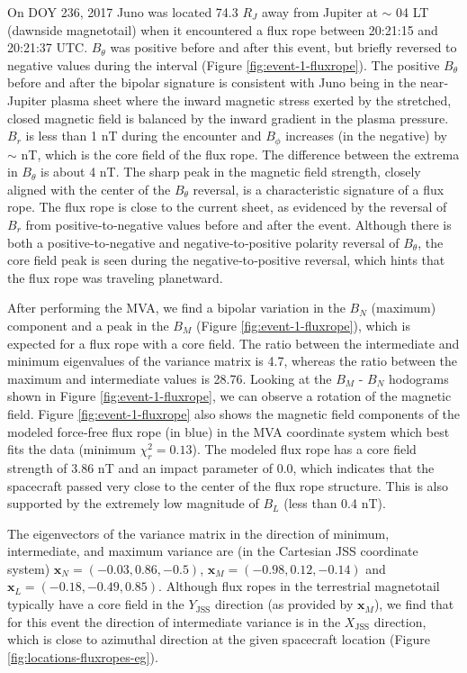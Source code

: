 On DOY 236, 2017 Juno was located 74.3 $R_J$ away from Jupiter at $\sim$ 04 LT (dawnside magnetotail) when it encountered a flux rope between 20:21:15 and 20:21:37 UTC. $B_\theta$ was positive before and after this event, but briefly reversed to negative values during the interval (Figure \ref{fig:event-1-fluxrope}). The positive $B_\theta$ before and after the bipolar signature is consistent with Juno being in the near‐Jupiter plasma sheet where the inward magnetic stress exerted by the stretched, closed magnetic field is balanced by the inward gradient in the plasma pressure. $B_r$ is less than 1 nT during the encounter and $B_\phi$ increases (in the negative) by $\sim$ nT, which is the core field of the flux rope. The difference between the extrema in $B_\theta$ is about 4 nT. The sharp peak in the magnetic field strength, closely aligned with the center of the $B_\theta$ reversal, is a characteristic signature of a flux rope. The flux rope is close to the current sheet, as evidenced by the reversal of $B_r$ from positive‐to‐negative values before and after the event. Although there is both a positive‐to‐negative and negative‐to‐positive polarity reversal of $B_\theta$, the core field peak is seen during the negative‐to‐positive reversal, which hints that the flux rope was traveling planetward.

After performing the MVA, we find a bipolar variation in the $B_N$ (maximum) component and a peak in the $B_M$ (Figure \ref{fig:event-1-fluxrope}), which is expected for a flux rope with a core field. The ratio between the intermediate and minimum eigenvalues of the variance matrix is 4.7, whereas the ratio between the maximum and intermediate values is 28.76. Looking at the $B_M$ - $B_N$ hodograms shown in Figure \ref{fig:event-1-fluxrope}, we can observe a rotation of the magnetic field. Figure \ref{fig:event-1-fluxrope} also shows the magnetic field components of the modeled force‐free flux rope (in blue) in the MVA coordinate system which best fits the data (minimum $\chi_r^2 = 0.13$). The modeled flux rope has a core field strength of 3.86 nT and an impact parameter of 0.0, which indicates that the spacecraft passed very close to the center of the flux rope structure. This is also supported by the extremely low magnitude of $B_L$ (less than 0.4 nT).

The eigenvectors of the variance matrix in the direction of minimum, intermediate, and maximum variance are (in the Cartesian JSS coordinate system) $\mathbf{x}_N=(-0.03,0.86,-0.5)$, $\mathbf{x}_M=(-0.98,0.12,-0.14)$ and $\mathbf{x}_L=(-0.18,-0.49,0.85)$. Although flux ropes in the terrestrial magnetotail typically have a core field in the $Y_\text{JSS}$ direction (as provided by $\mathbf{x}_M$), we find that for this event the direction of intermediate variance is in the $X_\text{JSS}$ direction, which is close to azimuthal direction at the given spacecraft location (Figure \ref{fig:locations-fluxropes-eg}).


